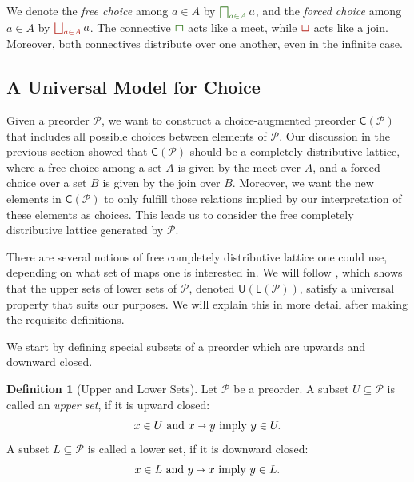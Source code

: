 \documentclass[12pt]{article}
\theoremstyle{definition}
\newtheorem{definition}{Definition}[section]
\theoremstyle{plain}
\theoremstyle{plain}
\theoremstyle{plain}
\theoremstyle{plain}
\theoremstyle{remark}
\theoremstyle{remark}
\newcommand{\mc}[1]{\mathcal{#1}}
\newcommand{\sub}{\subseteq}
\newcommand{\low}{\mathsf{L}}
\newcommand{\upper}{\mathsf{U}}
\newcommand{\cbigsqcap}[1]{\color{OliveGreen}\bigsqcap_{#1}\color{Black}}
\newcommand{\csqcap}{\color{OliveGreen}\bm{\sqcap}\color{Black}}
\newcommand{\cbigsqcup}[1]{\color{BrickRed}\bigsqcup_{#1}\color{Black}}
\newcommand{\csqcup}{\color{BrickRed}\bm{\sqcup}\color{Black}}
\begin{document}
\begin{tcolorbox}[title=Choice Connectives, colframe=Apricot, colback = paleorange, coltitle = Sepia]
	We denote the \emph{free choice} among $a \in A$ by $\cbigsqcap{a \in A} a$, and 
	the \emph{forced choice} among $a \in A$ by $\cbigsqcup{a \in A} a$. The connective $\csqcap{}$ acts like a meet, while $\csqcup{}$ acts like a join. Moreover, both connectives distribute over one another, even in the infinite case.
\end{tcolorbox}

\subsection{A Universal Model for Choice}
Given a preorder $\mc{P}$, we want to construct a choice-augmented preorder $\mathsf{C}(\mc{P})$ that includes all possible choices between elements of $\mc{P}$. Our discussion in the previous section showed that $\mathsf{C}(\mc{P})$ should be a completely distributive lattice, where a free choice among a set $A$ is given by the meet over $A$, and a forced choice over a set $B$ is given by the join over $B$. Moreover, we want the new elements in $\mathsf{C}(\mc{P})$ to only fulfill those relations implied by our interpretation of these elements as choices. This leads us to consider the free completely distributive lattice generated by $\mc{P}$.

There are several notions of free completely distributive lattice one could use, depending on what set of maps one is interested in. We will follow \cite{Morris2004}, which shows that the upper sets of lower sets of $\mc{P}$, denoted $\upper(\low(\mc{P}))$, satisfy a universal property that suits our purposes. We will explain this in more detail after making the requisite definitions.

We start by defining special subsets of a preorder which are upwards and downward closed.
\begin{definition}[Upper and Lower Sets]
	Let $\mc{P}$ be a preorder. A subset $U \sub \mc{P}$ is called an \emph{upper set}, if it is upward closed: 
	$$x \in U \text{ and } x \shortrightarrow y  \text{ imply } y \in U.$$
	A subset $L \sub \mc{P}$ is called a lower set, if it is downward closed:
	$$x \in L \text{ and } y \shortrightarrow x  \text{ imply } y \in L.$$
\end{definition}
\end{document}
